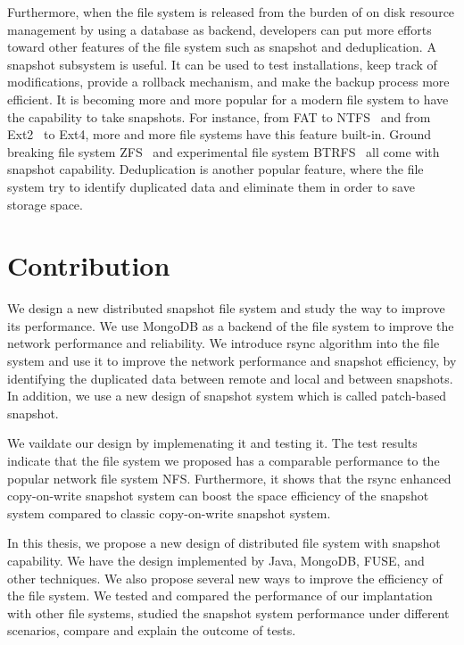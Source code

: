     Furthermore, when the file system is released from the burden of on disk resource management by using a database as backend, developers can put more efforts toward other features of the file system such as snapshot and deduplication. A snapshot subsystem is useful. It can be used to test installations, keep track of modifications, provide a rollback mechanism, and make the backup process more efficient. It is becoming more and more popular for a modern file system to have the capability to take snapshots. For instance, from FAT to NTFS~\cite{ntfs} and from Ext2~\cite{ext2_wiki} to Ext4, more and more file systems have this feature built-in. Ground breaking file system ZFS~\cite{zfs_wiki} and experimental file system BTRFS~\cite{btrfs} all come with snapshot capability. Deduplication is another popular feature, where the file system try to identify duplicated data and eliminate them in order to save storage space.

\section{Contribution}

    We design a new distributed snapshot file system and study the way to improve its performance. We use MongoDB as a backend of the file system to improve the network performance and reliability. We introduce rsync algorithm into the file system and use it to improve the network performance and snapshot efficiency, by identifying the duplicated data between remote and local and between snapshots. In addition, we use a new design of snapshot system which is called patch-based snapshot. 

    We vaildate our design by implemenating it and testing it. The test results indicate that the file system we proposed has a comparable performance to the popular network file system NFS. Furthermore, it shows that the rsync enhanced copy-on-write snapshot system can boost the space efficiency of the snapshot system compared to classic copy-on-write snapshot system.

    In this thesis, we propose a new design of distributed file system with snapshot capability. We have the design implemented by Java, MongoDB, FUSE, and other techniques. We also propose several new ways to improve the efficiency of the file system. We tested and compared the performance of our implantation with other file systems, studied the snapshot system performance under different scenarios, compare and explain the outcome of tests.
